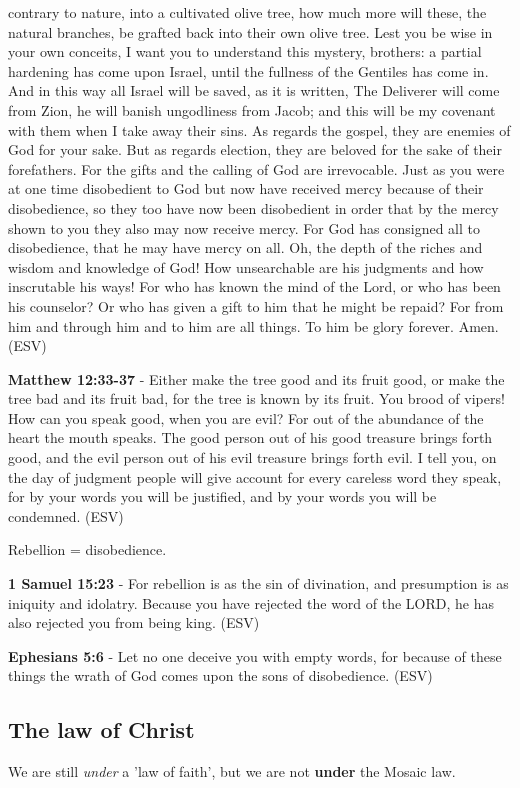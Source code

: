 \documentclass[11pt]{article}
\begin{document}
contrary to nature, into a cultivated olive tree, how much more will these, the natural branches, be grafted back into their own olive tree. Lest you be wise in your own conceits, I want you to understand this mystery, brothers: a partial hardening has come upon Israel, until the fullness of the Gentiles has come in. And in this way all Israel will be saved, as it is written, The Deliverer will come from Zion, he will banish ungodliness from Jacob; and this will be my covenant with them when I take away their sins. As regards the gospel, they are enemies of God for your sake. But as regards election, they are beloved for the sake of their forefathers. For the gifts and the calling of God are irrevocable. Just as you were at one time disobedient to God but now have received mercy because of their disobedience, so they too have now been disobedient in order that by the mercy shown to you they also may now receive mercy. For God has consigned all to disobedience, that he may have mercy on all. Oh, the depth of the riches and wisdom and knowledge of God! How unsearchable are his judgments and how inscrutable his ways! For who has known the mind of the Lord, or who has been his counselor? Or who has given a gift to him that he might be repaid? For from him and through him and to him are all things. To him be glory forever. Amen. (ESV)

\textbf{Matthew 12:33-37} - Either make the tree good and its fruit good, or make the tree bad and its fruit bad, for the tree is known by its fruit. You brood of vipers! How can you speak good, when you are evil? For out of the abundance of the heart the mouth speaks. The good person out of his good treasure brings forth good, and the evil person out of his evil treasure brings forth evil. I tell you, on the day of judgment people will give account for every careless word they speak, for by your words you will be justified, and by your words you will be condemned. (ESV)

Rebellion = disobedience.

\textbf{1 Samuel 15:23} - For rebellion is as the sin of divination, and presumption is as iniquity and idolatry. Because you have rejected the word of the LORD, he has also rejected you from being king. (ESV)

\textbf{Ephesians 5:6} - Let no one deceive you with empty words, for because of these things the wrath of God comes upon the sons of disobedience. (ESV)

\subsection{The law of Christ}
\label{sec:org565ab7e}
We are still \emph{under} a 'law of faith', but we are not \textbf{under} the Mosaic law.
\end{document}
